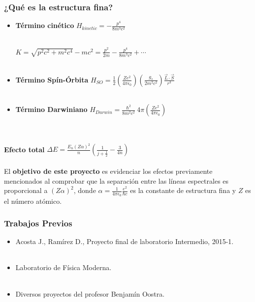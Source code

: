 \documentclass{beamer}
\begin{document}
\begin{frame}
\frametitle{¿Qué es la estructura fina?}
\begin{itemize}
	\item \textbf{Término cinético} $H_{kinetic} = - \frac{p^4}{8m^3c^2}$
	\\\
	
	
	$K = \sqrt{p^2c^2 + m^2c^4} - mc^2 = \frac{p^2}{2m} - \frac{p^4}{8m^3c^2} + \cdots$
	\
	\\
	\
	\\
	
	\item \textbf{Término Spín-Órbita} $H_{SO} = \frac{1}{2} \left( \frac{Ze^2}{4 \pi \epsilon_{0}} \right) \left( \frac{g_{s}}{2m^2c^2} \right) \frac{\vec{L}\cdot \vec{S}}{r^3}$
	\
	\\
	\
	\\
	
	\item \textbf{Término Darwiniano} $H_{Darwin} = \frac{\hbar^2}{8m^2c^2}\ 4 \pi \left( \frac{Ze^2}{4 \pi \epsilon_{0}} \right)$
	\
	\\
	\
	\\
\end{itemize}
\
\\
\textbf{Efecto total} $\Delta E = \frac{E_{n}(Z\alpha)^2}{n}\left( \frac{1}{j+\frac{1}{2}} - \frac{3}{4n} \right)$
\
\\
\
\\


El \textbf{objetivo de este proyecto} es evidenciar los efectos previamente mencionados al comprobar que la separación entre las líneas espectrales es proporcional a $(Z\alpha)^2$, donde $\alpha = \frac{1}{4 \pi \epsilon_{0}}\frac{e^2}{\hbar c}$ es la constante de estructura fina y $Z$ es el número atómico.
\end{frame}


\begin{frame}[fragile] %
\frametitle{Trabajos Previos}

\begin{itemize}
	\item Acosta J., Ramírez D., Proyecto final de laboratorio Intermedio, 2015-1.
	\
	\\ 
	\
	\\
	
	\item Laboratorio de Física Moderna.
	\
	\\
	\
	\\
	
	\item Diversos proyectos del profesor Benjamín Oostra.
	
\end{itemize}
\end{frame}
\end{document}
